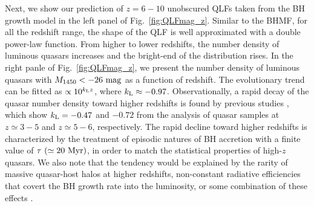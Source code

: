 \documentclass[twocolumn, twocolappendix]{aastex63}
\newcommand{\Muv}{M_{1450}}
\newcommand{\red}[1]{\textcolor{red}{ #1}}
\begin{document}
\begin{CJK*}{UTF8}{gbsn}
Next, we show our prediction of $z=6-10$ unobscured QLFs taken from the BH growth model in the left panel of Fig.~\ref{fig:QLFmag_z}.
Similar to the BHMF, for all the redshift range, the shape of the QLF is well approximated with a double power-law function.
From higher to lower redshifts, the number density of luminous quasars increases and the bright-end of the distribution rises.
In the right panle of Fig.~\ref{fig:QLFmag_z}, we present the number density of luminous quasars with $\Muv <-26~{\rm mag}$ as a function of redshift.
The evolutionary trend can be fitted as $\propto 10^{k_{\rm L}z}$, where $k_{\rm L}\approx -0.97$.
Observationally, a rapid decay of the quasar number density toward higher redshifts is found by previous studies
\citep[e.g.,][]{2001AJ....122.2833F,2013ApJ...768..105M,2016ApJ...833..222J,2019ApJ...884...30W},
which show $k_{\rm L}= -0.47$ and $-0.72$ from the analysis of quasar samples at $z\simeq 3-5$ and $z\simeq 5-6$, respectively.
The rapid decline toward higher redshifts is characterized by the treatment of episodic natures of BH accretion with a finite value of
$\tau ~(\simeq 20~{\rm Myr})$, in order to match the statistical properties of high-$z$ quasars.
We also note that the tendency would be explained by the rarity of massive quasar-host halos at higher redshifts,
non-constant radiative efficiencies that covert the BH growth rate into the luminosity, or some combination of these effects
\citep[e.g.,][]{2010ApJ...718..231S}.
\fi


\end{CJK*}
\end{document}
